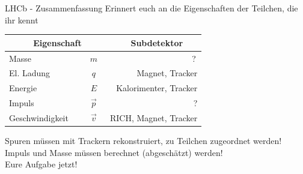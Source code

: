 \begin{frame}{LHCb - Zusammenfassung}
    Erinnert euch an die Eigenschaften der Teilchen, die ihr kennt \\
\begin{table}[]
    \centering
    \begin{tabular}{lcr}
    ~~~~~Eigenschaft&& Subdetektor~~~ \\ \hline 
 Masse & $m$ \,&  ?\, \\
     El. Ladung  & $q$ \,& Magnet, Tracker  \\
     Energie  & $E$ \,& Kalorimenter, Tracker  \\
     Impuls  & $\vec{p} $ \,& ?  \\
     Geschwindigkeit  & $\vec{v}$ \,& RICH, Magnet, Tracker \\ \hline
    \end{tabular} \pause
\end{table}
 Spuren müssen mit Trackern rekonstruiert, zu Teilchen zugeordnet werden!\\
 Impuls und Masse müssen berechnet (abgeschätzt) werden! \\\pause
   Eure Aufgabe jetzt!
\end{frame}

